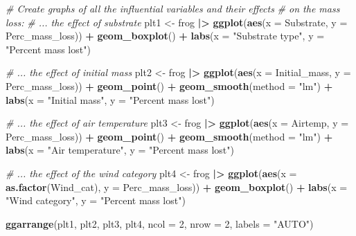 \documentclass[
  10t,
]{article}
\newenvironment{Shaded}{\begin{snugshade}}{\end{snugshade}}
\newcommand{\AttributeTok}[1]{\textcolor[rgb]{0.13,0.29,0.53}{#1}}
\newcommand{\CommentTok}[1]{\textcolor[rgb]{0.56,0.35,0.01}{\textit{#1}}}
\newcommand{\DecValTok}[1]{\textcolor[rgb]{0.00,0.00,0.81}{#1}}
\newcommand{\FunctionTok}[1]{\textcolor[rgb]{0.13,0.29,0.53}{\textbf{#1}}}
\newcommand{\NormalTok}[1]{#1}
\newcommand{\OtherTok}[1]{\textcolor[rgb]{0.56,0.35,0.01}{#1}}
\newcommand{\SpecialCharTok}[1]{\textcolor[rgb]{0.81,0.36,0.00}{\textbf{#1}}}
\newcommand{\StringTok}[1]{\textcolor[rgb]{0.31,0.60,0.02}{#1}}
\begin{document}
\begin{Shaded}
\begin{Highlighting}[]
\CommentTok{\# Create graphs of all the influential variables and their effects}
\CommentTok{\# on the mass loss:}
\CommentTok{\# ... the effect of substrate}
\NormalTok{plt1 }\OtherTok{\textless{}{-}}\NormalTok{ frog }\SpecialCharTok{|\textgreater{}} 
  \FunctionTok{ggplot}\NormalTok{(}\FunctionTok{aes}\NormalTok{(}\AttributeTok{x =}\NormalTok{ Substrate, }\AttributeTok{y =}\NormalTok{ Perc\_mass\_loss)) }\SpecialCharTok{+}
  \FunctionTok{geom\_boxplot}\NormalTok{() }\SpecialCharTok{+}
  \FunctionTok{labs}\NormalTok{(}\AttributeTok{x =} \StringTok{"Substrate type"}\NormalTok{,}
       \AttributeTok{y =} \StringTok{"Percent mass lost"}\NormalTok{)}

\CommentTok{\# ... the effect of initial mass}
\NormalTok{plt2 }\OtherTok{\textless{}{-}}\NormalTok{ frog }\SpecialCharTok{|\textgreater{}} 
  \FunctionTok{ggplot}\NormalTok{(}\FunctionTok{aes}\NormalTok{(}\AttributeTok{x =}\NormalTok{ Initial\_mass, }\AttributeTok{y =}\NormalTok{ Perc\_mass\_loss)) }\SpecialCharTok{+}
  \FunctionTok{geom\_point}\NormalTok{() }\SpecialCharTok{+}
  \FunctionTok{geom\_smooth}\NormalTok{(}\AttributeTok{method =} \StringTok{"lm"}\NormalTok{) }\SpecialCharTok{+}
  \FunctionTok{labs}\NormalTok{(}\AttributeTok{x =} \StringTok{"Initial mass"}\NormalTok{,}
       \AttributeTok{y =} \StringTok{"Percent mass lost"}\NormalTok{)}

\CommentTok{\# ... the effect of air temperature}
\NormalTok{plt3 }\OtherTok{\textless{}{-}}\NormalTok{ frog }\SpecialCharTok{|\textgreater{}} 
  \FunctionTok{ggplot}\NormalTok{(}\FunctionTok{aes}\NormalTok{(}\AttributeTok{x =}\NormalTok{ Airtemp, }\AttributeTok{y =}\NormalTok{ Perc\_mass\_loss)) }\SpecialCharTok{+}
  \FunctionTok{geom\_point}\NormalTok{() }\SpecialCharTok{+}
  \FunctionTok{geom\_smooth}\NormalTok{(}\AttributeTok{method =} \StringTok{"lm"}\NormalTok{) }\SpecialCharTok{+}
  \FunctionTok{labs}\NormalTok{(}\AttributeTok{x =} \StringTok{"Air temperature"}\NormalTok{,}
       \AttributeTok{y =} \StringTok{"Percent mass lost"}\NormalTok{)}

\CommentTok{\# ... the effect of the wind category}
\NormalTok{plt4 }\OtherTok{\textless{}{-}}\NormalTok{ frog }\SpecialCharTok{|\textgreater{}} 
  \FunctionTok{ggplot}\NormalTok{(}\FunctionTok{aes}\NormalTok{(}\AttributeTok{x =} \FunctionTok{as.factor}\NormalTok{(Wind\_cat), }\AttributeTok{y =}\NormalTok{ Perc\_mass\_loss)) }\SpecialCharTok{+}
  \FunctionTok{geom\_boxplot}\NormalTok{() }\SpecialCharTok{+}
  \FunctionTok{labs}\NormalTok{(}\AttributeTok{x =} \StringTok{"Wind category"}\NormalTok{,}
       \AttributeTok{y =} \StringTok{"Percent mass lost"}\NormalTok{)}

\FunctionTok{ggarrange}\NormalTok{(plt1, plt2, plt3, plt4, }\AttributeTok{ncol =} \DecValTok{2}\NormalTok{, }\AttributeTok{nrow =} \DecValTok{2}\NormalTok{, }\AttributeTok{labels =} \StringTok{"AUTO"}\NormalTok{)}
\end{Highlighting}
\end{Shaded}
\end{document}
